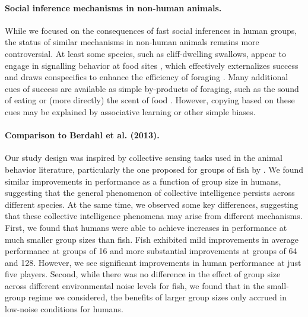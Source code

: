 \documentclass[12pt,letterpaper]{article}
\begin{document}
\paragraph{Social inference mechanisms in non-human animals.}


While we focused on the consequences of fast social inferences in human groups, the status of similar mechanisms in non-human animals remains more controversial.
At least some species, such as cliff-dwelling swallows, appear to engage in signalling behavior at food sites \cite{brown1988social,brown1991food}, which effectively externalizes success and draws conspecifics to enhance the efficiency of foraging \cite{torney2011signalling}.
Many additional cues of success are available as simple by-products of foraging, such as the sound of eating or (more directly) the scent of food \cite{galef2001social}.
However, copying based on these cues may be explained by associative learning or other simple biases.

\paragraph{Comparison to Berdahl et al. (2013).}

Our study design was inspired by collective sensing tasks used in the animal behavior literature, particularly the one proposed for groups of fish by . 
We found similar improvements in performance as a function of group size in humans, suggesting that the general phenomenon of collective intelligence persists across different species.
At the same time, we observed some key differences, suggesting that these collective intelligence phenomena may arise from different mechanisms.
First, we found that humans were able to achieve increases in performance at much smaller group sizes than fish. 
Fish exhibited mild improvements in average performance at groups of 16 and more substantial improvements at groups of 64 and 128.  
However, we see significant improvements in human performance at just five players. 
Second, while there was no difference in the effect of group size across different environmental noise levels for fish, we found that in the small-group regime we considered, the benefits of larger group sizes only accrued in low-noise conditions for humans.
\end{document}
